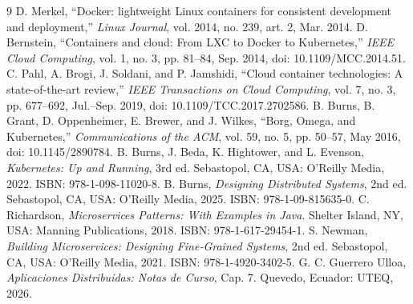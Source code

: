 \documentclass[11pt,a4paper]{article}
\begin{document}
\begin{thebibliography}{9}
\footnotesize
{} D. Merkel, ``Docker: lightweight Linux containers for consistent development and deployment,'' \emph{Linux Journal}, vol. 2014, no. 239, art. 2, Mar. 2014.
 D. Bernstein, ``Containers and cloud: From LXC to Docker to Kubernetes,'' \emph{IEEE Cloud Computing}, vol. 1, no. 3, pp. 81--84, Sep. 2014, doi: 10.1109/MCC.2014.51.
 C. Pahl, A. Brogi, J. Soldani, and P. Jamshidi, ``Cloud container technologies: A state-of-the-art review,'' \emph{IEEE Transactions on Cloud Computing}, vol. 7, no. 3, pp. 677--692, Jul.--Sep. 2019, doi: 10.1109/TCC.2017.2702586.
 B. Burns, B. Grant, D. Oppenheimer, E. Brewer, and J. Wilkes, ``Borg, Omega, and Kubernetes,'' \emph{Communications of the ACM}, vol. 59, no. 5, pp. 50--57, May 2016, doi: 10.1145/2890784.
 B. Burns, J. Beda, K. Hightower, and L. Evenson, \emph{Kubernetes: Up and Running}, 3rd ed. Sebastopol, CA, USA: O'Reilly Media, 2022. ISBN: 978-1-098-11020-8.
 B. Burns, \emph{Designing Distributed Systems}, 2nd ed. Sebastopol, CA, USA: O'Reilly Media, 2025. ISBN: 978-1-09-815635-0.
 C. Richardson, \emph{Microservices Patterns: With Examples in Java}. Shelter Island, NY, USA: Manning Publications, 2018. ISBN: 978-1-617-29454-1.
 S. Newman, \emph{Building Microservices: Designing Fine-Grained Systems}, 2nd ed. Sebastopol, CA, USA: O'Reilly Media, 2021. ISBN: 978-1-4920-3402-5.
 G. C. Guerrero Ulloa, \emph{Aplicaciones Distribuidas: Notas de Curso}, Cap. 7. Quevedo, Ecuador: UTEQ, 2026.
\end{thebibliography}
\end{document}
